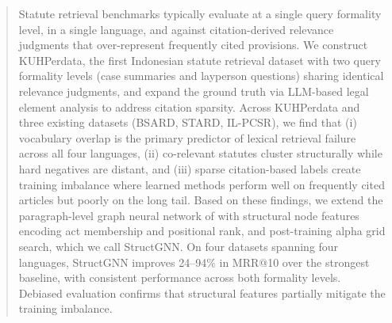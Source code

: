 \begin{abstract}
Statute retrieval benchmarks typically evaluate at a single query formality level, in a single language, and against citation-derived relevance judgments that over-represent frequently cited provisions. We construct KUHPerdata, the first Indonesian statute retrieval dataset with two query formality levels (case summaries and layperson questions) sharing identical relevance judgments, and expand the ground truth via LLM-based legal element analysis to address citation sparsity. Across KUHPerdata and three existing datasets (BSARD, STARD, IL-PCSR), we find that (i) vocabulary overlap is the primary predictor of lexical retrieval failure across all four languages, (ii) co-relevant statutes cluster structurally while hard negatives are distant, and (iii) sparse citation-based labels create training imbalance where learned methods perform well on frequently cited articles but poorly on the long tail. Based on these findings, we extend the paragraph-level graph neural network of \citet{ilpcsr} with structural node features encoding act membership and positional rank, and post-training alpha grid search, which we call StructGNN. On four datasets spanning four languages, StructGNN improves 24--94\% in MRR@10 over the strongest baseline, with consistent performance across both formality levels. Debiased evaluation confirms that structural features partially mitigate the training imbalance.
\end{abstract}
